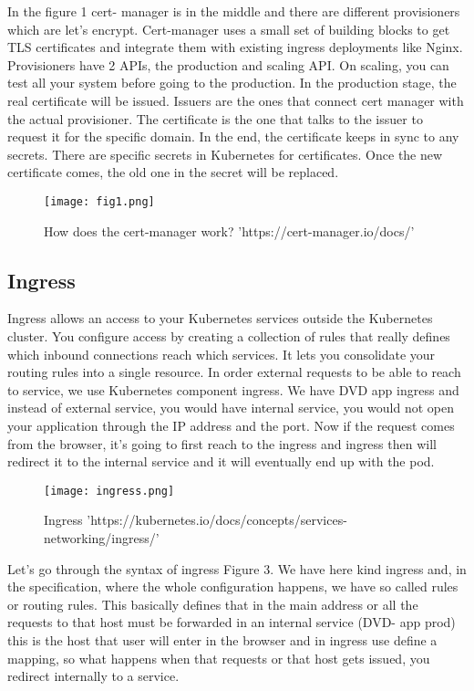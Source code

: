 In the figure 1  cert- manager is in the middle and there are different provisioners which are let’s encrypt. Cert-manager uses a small set of building blocks to get TLS certificates and integrate them with existing ingress deployments like Nginx. Provisioners have 2 APIs, the production and scaling API. On scaling, you can test all your system before going to the production.  In the production stage, the real certificate will be issued. Issuers are the ones that connect cert manager with the actual provisioner. The certificate is the one that talks to the issuer to request it for the specific domain. In the end, the certificate keeps in sync to any secrets. There are specific secrets in Kubernetes for certificates. Once the new certificate comes, the old one in the secret will be replaced.

\begin{figure}
    \centering
    \texttt{[image: fig1.png]}
    \caption{How does the cert-manager work? 'https://cert-manager.io/docs/'}
    \label{fig:my_label}
\end{figure}


\subsection{Ingress}


Ingress allows an access to your Kubernetes services outside the Kubernetes cluster. You configure access by creating a collection of rules that really defines which inbound connections reach which services. It lets you consolidate your routing rules into a single resource. 
In order external requests to be able to reach to service, we use Kubernetes component ingress.  We have DVD app ingress and instead of external service, you would have internal service, you would not open your application through the IP address and the port.  Now if the request comes from the browser, it’s going to first reach to the ingress and ingress then will redirect it to the internal service and it will eventually end up with the pod. 
\begin{figure}
    \centering
    \texttt{[image: ingress.png]}
    \caption{Ingress 'https://kubernetes.io/docs/concepts/services-networking/ingress/'}
    \label{fig:my_label}
\end{figure}

Let’s go through the syntax of ingress Figure 3. We have here kind ingress and, in the specification, where the whole configuration happens, we have so called rules or routing rules. This basically defines that in the main address or all the requests to that host must be forwarded in an internal service (DVD- app prod) this is the host that user will enter in the browser and in ingress use define a mapping, so what happens when that requests or that host gets issued, you redirect internally to a service. 


